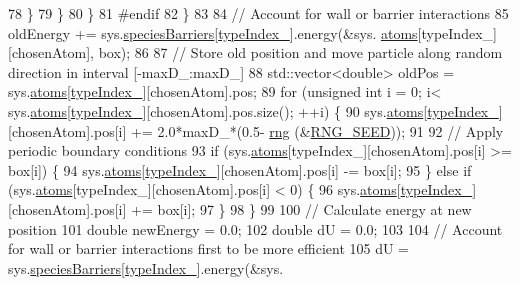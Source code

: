 \begin{DoxyCode}
78                 \}
79             \}
80         \}
81 \textcolor{preprocessor}{#endif}
82 \textcolor{preprocessor}{}    \}
83 
84     \textcolor{comment}{// Account for wall or barrier interactions}
85     oldEnergy += sys.\hyperlink{classsim_system_a5ae652ff4519f39c3862abae32a9581b}{speciesBarriers}[\hyperlink{classmc_move_acb731965547b0326ef318ec96da8b46a}{typeIndex\_}].energy(&sys.
      \hyperlink{classsim_system_a90421b19082f7fb8fc23b7264b1161e4}{atoms}[typeIndex\_][chosenAtom], box);
86 
87     \textcolor{comment}{// Store old position and move particle along random direction in interval [-maxD\_:maxD\_]}
88     std::vector<double> oldPos = sys.\hyperlink{classsim_system_a90421b19082f7fb8fc23b7264b1161e4}{atoms}[\hyperlink{classmc_move_acb731965547b0326ef318ec96da8b46a}{typeIndex\_}][chosenAtom].pos;
89     \textcolor{keywordflow}{for} (\textcolor{keywordtype}{unsigned} \textcolor{keywordtype}{int} i = 0; i< sys.\hyperlink{classsim_system_a90421b19082f7fb8fc23b7264b1161e4}{atoms}[\hyperlink{classmc_move_acb731965547b0326ef318ec96da8b46a}{typeIndex\_}][chosenAtom].pos.size(); ++i) \{
90         sys.\hyperlink{classsim_system_a90421b19082f7fb8fc23b7264b1161e4}{atoms}[\hyperlink{classmc_move_acb731965547b0326ef318ec96da8b46a}{typeIndex\_}][chosenAtom].pos[i] += 2.0*maxD\_*(0.5-
      \hyperlink{utilities_8cpp_a0f9542af4b475ac79cb679d7a8d14db0}{rng} (&\hyperlink{global_8h_a3f4e4ea24d5a5c66feae55d1f329c884}{RNG\_SEED}));
91 
92         \textcolor{comment}{// Apply periodic boundary conditions}
93         \textcolor{keywordflow}{if} (sys.\hyperlink{classsim_system_a90421b19082f7fb8fc23b7264b1161e4}{atoms}[typeIndex\_][chosenAtom].pos[i] >= box[i]) \{
94             sys.\hyperlink{classsim_system_a90421b19082f7fb8fc23b7264b1161e4}{atoms}[\hyperlink{classmc_move_acb731965547b0326ef318ec96da8b46a}{typeIndex\_}][chosenAtom].pos[i] -= box[i];
95         \} \textcolor{keywordflow}{else} \textcolor{keywordflow}{if} (sys.\hyperlink{classsim_system_a90421b19082f7fb8fc23b7264b1161e4}{atoms}[typeIndex\_][chosenAtom].pos[i] < 0) \{
96             sys.\hyperlink{classsim_system_a90421b19082f7fb8fc23b7264b1161e4}{atoms}[\hyperlink{classmc_move_acb731965547b0326ef318ec96da8b46a}{typeIndex\_}][chosenAtom].pos[i] += box[i];
97         \}
98     \}
99 
100     \textcolor{comment}{// Calculate energy at new position}
101     \textcolor{keywordtype}{double} newEnergy = 0.0;
102     \textcolor{keywordtype}{double} dU = 0.0;
103 
104     \textcolor{comment}{// Account for wall or barrier interactions first to be more efficient}
105     dU = sys.\hyperlink{classsim_system_a5ae652ff4519f39c3862abae32a9581b}{speciesBarriers}[\hyperlink{classmc_move_acb731965547b0326ef318ec96da8b46a}{typeIndex\_}].energy(&sys.

\end{DoxyCode}

